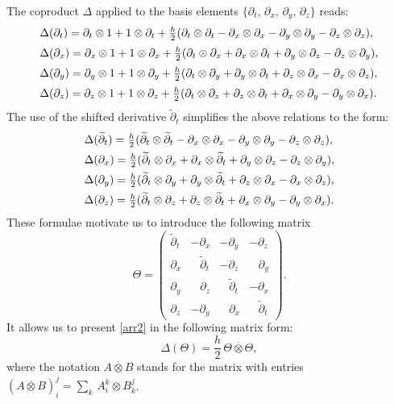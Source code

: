\documentclass[11pt]{article}
\newcommand{\pa}{\partial}
\newcommand{\De}{\Delta}
\newcommand{\ot}{\otimes}
\newcommand{\tpa}{\widetilde{\pa}}
\numberwithin{equation}{section}
\theoremstyle{plain}
\theoremstyle{definition}
\begin{document}
The coproduct $\De$ applied to the basis elements $\{\pa_t,\,\pa_x,\,\pa_y,\,\pa_z\}$ reads:
\begin{equation}
\begin{array}{l}
	\De(\pa_t)=\pa_t\ot 1+ 1\ot \pa_t+\frac{h}{2}(\pa_t\ot \pa_t-\pa_x\ot \pa_x-\pa_y\ot \pa_y-\pa_z\ot \pa_z),\\
	\rule{0pt}{5mm}
	\rule{0pt}{5mm}
	\De(\pa_x)=\pa_x\ot 1+ 1\ot \pa_x +   \frac{h}{2}(\pa_t\ot \pa_x+\pa_x\ot \pa_t+\pa_y\ot \pa_z-\pa_z\ot \pa_y),\\
	\rule{0pt}{5mm}
	\De(\pa_y)=\pa_y\ot 1+ 1\ot \pa_y+  \frac{h}{2}(\pa_t\ot \pa_y+\pa_y\ot \pa_t+\pa_z\ot \pa_x-\pa_x\ot \pa_z),\\
	\rule{0pt}{5mm}
	\De(\pa_z)=\pa_z\ot 1+ 1\ot \pa_z+ \frac{h}{2}(\pa_t\ot \pa_z+\pa_z\ot \pa_t+\pa_x\ot \pa_y-\pa_y\ot \pa_x).
\end{array}
\label{arr0}
\end{equation}
The use of the shifted derivative $\tpa_t$ simplifies the above relations to the form:
\begin{equation}
\begin{array}{l}
	\De(\tpa_t)=\frac{h}{2}(\tpa_t\ot \tpa_t-\pa_x\ot \pa_x-\pa_y\ot \pa_y-\pa_z\ot \pa_z),\\
	\rule{0pt}{5mm}
	\rule{0pt}{5mm}
	\De(\pa_x)=\frac{h}{2}(\tpa_t\ot \pa_x+\pa_x\ot \tpa_t+\pa_y\ot \pa_z-\pa_z\ot \pa_y),\\
	\rule{0pt}{5mm}
	\De(\pa_y)=\frac{h}{2}(\tpa_t\ot \pa_y+\pa_y\ot \tpa_t+\pa_z\ot \pa_x-\pa_x\ot \pa_z),\\
	\rule{0pt}{5mm}
	\De(\pa_z)=\frac{h}{2}(\tpa_t\ot \pa_z+\pa_z\ot \tpa_t+\pa_x\ot \pa_y-\pa_y\ot \pa_x).
\end{array} \label{arr2}
\end{equation}
These formulae motivate us to introduce   the following matrix
\begin{equation} {\Theta}=\left(\begin{array}{llll}
	\tpa_t&-\pa_x&-\pa_y&-\pa_z\\
	\pa_x&\,\,\,\,\,\tpa_t&-\pa_z&\,\,\,\,\,\pa_y\\
	\pa_y&\,\,\,\,\,\pa_z&\,\,\,\,\,\tpa_t&-\pa_x\\
	\pa_z&-\pa_y&\,\,\,\,\,\pa_x&\,\,\,\,\,\tpa_t \end{array} \right). \label{seven}
\end{equation}
It allows us to present \eqref{arr2} in the following matrix form:
\[
\De ({\Theta})=\frac{h}{2}\, {\Theta} \stackrel{.}{\otimes} {\Theta},
\]
where the notation $A\stackrel{.}{\otimes} B$ stands for the matrix with entries $(A\stackrel{.}{\otimes} B)_i^j=\sum_k\, A_i^k\ot B_k^j $.
\end{document}
